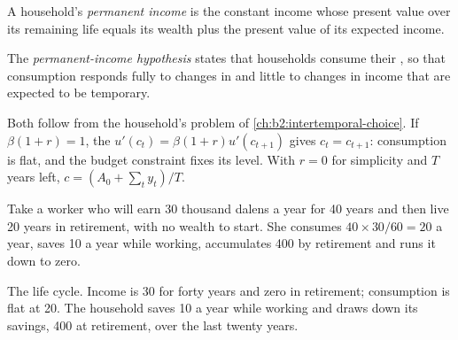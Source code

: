 \begin{definition}\label{def:b2:consumption:permanent-income}
A household's \emph{permanent income} is the constant income whose present value over its
remaining life equals its wealth plus the present value of its expected income.
\end{definition}

\begin{definition}\label{def:b2:consumption:pih}
The \emph{permanent-income hypothesis} states that households consume their , so that consumption responds fully to changes in  and little to changes in income that are
expected to be temporary.
\end{definition}

Both follow from the household's problem of \cref{ch:b2:intertemporal-choice}. If $\beta(1 + r) = 1$, the  $u'(c_t) =
\beta(1 + r)u'(c_{t+1})$ gives $c_t = c_{t+1}$: consumption is flat, and the budget constraint fixes its level. With $r = 0$ for simplicity and
$T$ years left, $c = (A_0 + \sum_t y_t)/T$.

Take a worker who will earn 30 thousand dalens a year for 40 years and then live 20 years in retirement, with no wealth to
start. She consumes $40 \times 30/60 = 20$ a year, saves 10 a year while working, accumulates 400 by retirement and runs it down to
zero.

\begin{omfigure}

{\small The life cycle. Income is 30 for forty years and zero in retirement; consumption is flat at 20. The household saves
10 a year while working and draws down its savings, 400 at retirement, over the last twenty years.}
\end{omfigure}


